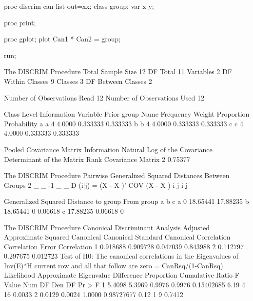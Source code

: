 \documentclass{article}
\begin{document}
\begin{Winput}
proc discrim can list out=xx;
    class group;
    var x y;
    
proc print;

proc gplot;
    plot Can1 * Can2 = group;

run;
\end{Winput}
\begin{Woutput}
The DISCRIM Procedure
Total Sample Size       12          DF Total                11
Variables                2          DF Within Classes        9
Classes                  3          DF Between Classes       2

Number of Observations Read             12
Number of Observations Used             12

                        Class Level Information
         Variable                                                  Prior
group    Name        Frequency       Weight    Proportion    Probability
a        a                   4       4.0000      0.333333       0.333333
b        b                   4       4.0000      0.333333       0.333333
c        c                   4       4.0000      0.333333       0.333333

Pooled Covariance Matrix Information
               Natural Log of the
 Covariance    Determinant of the
Matrix Rank     Covariance Matrix
          2               0.75377

The DISCRIM Procedure
Pairwise Generalized Squared Distances Between Groups
 2         _   _       -1  _   _
D (i|j) = (X - X )' COV   (X - X )
            i   j           i   j

     Generalized Squared Distance to group
From
group              a             b             c
a                  0      18.65441      17.88235
b           18.65441             0       0.06618
c           17.88235       0.06618             0

The DISCRIM Procedure
Canonical Discriminant Analysis
                           Adjusted    Approximate        Squared
           Canonical      Canonical       Standard      Canonical
         Correlation    Correlation          Error    Correlation
       1    0.918688       0.909728       0.047039       0.843988
       2    0.112797        .             0.297675       0.012723
                                                      Test of H0: The canonical correlations in the
                   Eigenvalues of Inv(E)*H               current row and all that follow are zero
                     = CanRsq/(1-CanRsq)
                                                     Likelihood Approximate
         Eigenvalue Difference Proportion Cumulative      Ratio     F Value Num DF Den DF Pr > F
       1     5.4098     5.3969     0.9976     0.9976 0.15402685        6.19      4     16 0.0033
       2     0.0129                0.0024     1.0000 0.98727677        0.12      1      9 0.7412


\end{Woutput}
\end{document}
